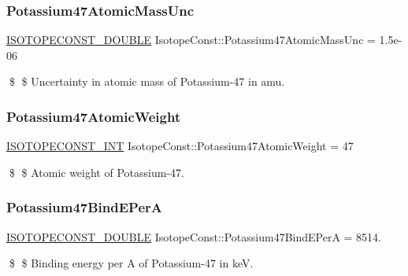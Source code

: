 \subsubsection{\texorpdfstring{Potassium47\+Atomic\+Mass\+Unc}{Potassium47AtomicMassUnc}}
{\footnotesize\ttfamily \mbox{\hyperlink{group___isotope_const-_macros_ga8f45a7272ce02c0b4c65c44636ed719a}{I\+S\+O\+T\+O\+P\+E\+C\+O\+N\+S\+T\+\_\+\+D\+O\+U\+B\+LE}} Isotope\+Const\+::\+Potassium47\+Atomic\+Mass\+Unc = 1.\+5e-\/06}

\$ \$ Uncertainty in atomic mass of Potassium-\/47 in amu. \mbox{\label{group___isotope_const-_potassium-_k47_ga02c4c9178ba1db094b195d5841ea359c}} 
\subsubsection{\texorpdfstring{Potassium47\+Atomic\+Weight}{Potassium47AtomicWeight}}
{\footnotesize\ttfamily \mbox{\hyperlink{group___isotope_const-_macros_ga5f18360b3e99483a35c32d789e62621c}{I\+S\+O\+T\+O\+P\+E\+C\+O\+N\+S\+T\+\_\+\+I\+NT}} Isotope\+Const\+::\+Potassium47\+Atomic\+Weight = 47}

\$ \$ Atomic weight of Potassium-\/47. \mbox{\label{group___isotope_const-_potassium-_k47_gad71afb8a26871f1bf13419cf3fce6992}} 
\subsubsection{\texorpdfstring{Potassium47\+Bind\+E\+PerA}{Potassium47BindEPerA}}
{\footnotesize\ttfamily \mbox{\hyperlink{group___isotope_const-_macros_ga8f45a7272ce02c0b4c65c44636ed719a}{I\+S\+O\+T\+O\+P\+E\+C\+O\+N\+S\+T\+\_\+\+D\+O\+U\+B\+LE}} Isotope\+Const\+::\+Potassium47\+Bind\+E\+PerA = 8514.}

\$ \$ Binding energy per A of Potassium-\/47 in keV. \mbox{\label{group___isotope_const-_potassium-_k47_gac34246af7e8bab4413ad3e28bdc308e8}} 
